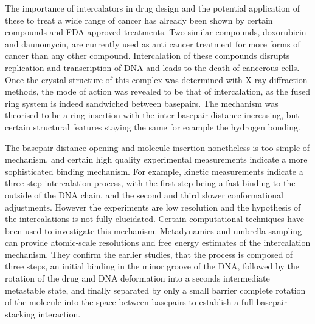 The importance of intercalators in drug design and the potential application of these to treat a wide range of cancer has already been shown by certain compounds and FDA approved treatments. Two similar compounds, doxorubicin and daunomycin, are currently used as anti cancer treatment for more forms of cancer than any other compound. Intercalation of these compounds disrupts replication and transcription of DNA and leads to the death of cancerous cells. Once the crystal structure of this complex was determined with X-ray diffraction methods, the mode of action was revealed to be that of intercalation, as the fused ring system is indeed sandwiched between basepairs. The mechanism was theorised to be a ring-insertion with the inter-basepair distance increasing, but certain structural features staying the same for example the hydrogen bonding.


The basepair distance opening and molecule insertion nonetheless is too simple of mechanism, and certain high quality experimental measurements indicate a more sophisticated binding mechanism. For example, kinetic measurements indicate a three step intercalation process, with the first step being a fast binding to the outside of the DNA chain, and the second and third slower conformational adjustments. However the experiments are low resolution and the hypothesis of the intercalations is not fully elucidated. Certain computational techniques have been used to investigate this mechanism. Metadynamics and umbrella sampling can provide atomic-scale resolutions and free energy estimates of the intercalation mechanism. They confirm the earlier studies, that the process is composed of three steps, an initial binding in the minor groove of the DNA, followed by the rotation of the drug and DNA deformation into a seconds intermediate metastable state, and finally separated by only a small barrier complete rotation of the molecule into the space between basepairs to establish a full basepair stacking interaction.

% 



